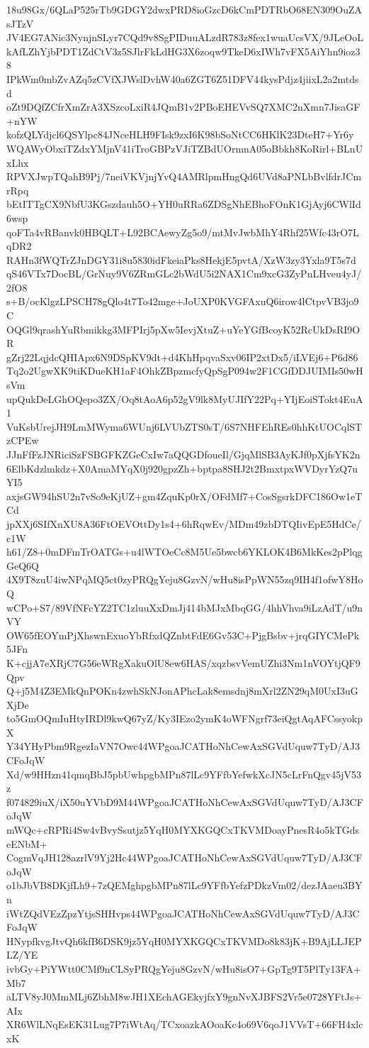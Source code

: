 18u98Gx/6QLaP525rTb9GDGY2dwxPRD8ioGzcD6kCmPDTRbO68EN309OuZAsJTzV
JV4EG7ANic3NynjnSLyr7CQd9v8SgPIDuuALzdR783z8fex1wuaUcsVX/9JLeOoL
kAfLZhYjbPDT1ZdCtV3z5SJlrFkLdHG3X6zoqw9TkeD6xIWh7vFX5AiYhn9ioz38
IPkWm0mbZvAZq5zCVfXJWslDvhW40a6ZGT6Z51DFV44kysPdjz4jiixL2a2mtdsd
oZt9DQfZCfrXmZrA3XSzcoLxiR4JQmB1v2PBoEHEVvSQ7XMC2nXmn7JisaGF+nYW
kofzQLYdjcl6QSYlpc84JNceHLH9FIsk9zxI6K98bSoNtCC6HKlK23DteH7+Yr6y
WQAWyObxiTZdxYMjnV41iTroGBPzVJiTZBdUOrmnA05oBbkh8KoRirl+BLnUxLhx
RPVXJwpTQahB9Pj/7neiVKVjnjYvQ4AMRlpmHngQd6UVd8aPNLbBvlfdrJCmrRpq
bEtITTgCX9NbfU3KGszdauh5O+YH0uRRa6ZDSgNhEBhoFOnK1GjAyj6CWlId6wsp
qoFTa4vRBanvk0HBQLT+L92BCAewyZg5o9/mtMvJwbMhY4Rhf25Wfc43rO7LqDR2
RAHn3fWQTrZJnDGY31i8u5830idFkeiaPks8HekjE5pvtA/XzW3zy3Yxla9T5s7d
qS46VTx7DocBL/GrNuy9V6ZRmGLc2bWdU5i2NAX1Cm9xcG3ZyPnLHveu4yJ/2fO8
s+B/ocKlgzLPSCH78gQlo4t7To42mge+JoUXP0KVGFAxuQ6irow4lCtpvVB3jo9C
OQGl9qrashYuRbmikkg3MFPIrj5pXw5IevjXtuZ+uYeYGfBcoyK52RcUkDsRI9OR
gZrj22LqjdcQHIApx6N9DSpKV9dt+d4KhHpqvaSxv06IP2xtDx5/iLVEj6+P6d86
Tq2o2UgwXK9tiKDueKH1aF4OhkZBpzmcfyQpSgP094w2F1CGfDDJUIMIs50wHsVm
upQukDeLGhOQepo3ZX/Oq8tAoA6p52gV9lk8MyUJIfY22Pq+YIjEoiSTokt4EuA1
VuKsbUrejJH9LmMWyma6WUnj6LVUbZTS0sT/6S7NHFEhREs0hhKtUOCqlSTzCPEw
JJnFfFzJNRiciSzFSBGFKZGeCxIw7aQQGDfoueIl/GjqMlSB3AyKJf0pXjfsYK2n
6ElbKdzlmkdz+X0AmaMYqX0j920gpzZh+bptpa8SHJ2t2BmxtpxWVDyrYzQ7uYI5
axjsGW94hSU2n7vSo9eKjUZ+gm4ZquKp0rX/OFdMf7+CosSgsrkDFC186Ow1eTCd
jpXXj6SIfXnXU8A36FtOEVOttDy1s4+6hRqwEv/MDm49zbDTQIivEpE5HdCe/c1W
h61/Z8+0mDFmTrOATGs+u4lWTOeCc8M5Ue5bwcb6YKLOK4B6MkKes2pPlqgGeQ6Q
4X9T8zuU4iwNPqMQ5ct0zyPRQgYeju8GzvN/wHu8isPpWN55zq9IH4f1ofwY8HoQ
wCPo+S7/89VfNFcYZ2TC1zluuXxDmJj414bMJxMbqGG/4hhVhva9iLzAdT/u9nVY
OW65fEOYmPjXhswnExuoYbRfxdQZnbtFdE6Gv53C+PjgBsbv+jrqGIYCMePk5JFn
K+cjjA7eXRjC7G56eWRgXakuOlU8ew6HAS/xqzbsvVemUZhi3Nm1nVOYtjQF9Qpv
Q+j5M4Z3EMkQnPOKn4zwhSkNJonAPhcLak8emsdnj8mXrl2ZN29qM0UxI3uGXjDe
to5GmOQmIuHtyIRDl9kwQ67yZ/Ky3IEzo2ymK4oWFNgrf73eiQgtAqAFCssyokpX
Y34YHyPbm9RgezIaVN7Owc44WPgoaJCATHoNhCewAxSGVdUquw7TyD/AJ3CFoJqW
Xd/w9HHzn41qmqBbJ5pbUwhpgbMPn87lLc9YFfbYefwkXcJN5cLrFnQgv45jV53z
f074829iuX/iX50uYVbD9M44WPgoaJCATHoNhCewAxSGVdUquw7TyD/AJ3CFoJqW
mWQc+cRPRi4Sw4vBvySsutjz5YqH0MYXKGQCxTKVMDoayPnesR4o5kTGdseENbM+
CogmVqJH128azrlV9Yj2Hc44WPgoaJCATHoNhCewAxSGVdUquw7TyD/AJ3CFoJqW
o1bJbVB8DKjfLh9+7zQEMghpgbMPn87lLc9YFfbYefzPDkzVm02/dezJAaeu3BYn
iWtZQdVEzZpzYtjsSHHvps44WPgoaJCATHoNhCewAxSGVdUquw7TyD/AJ3CFoJqW
HNypfkvgJtvQh6kfB6DSK9jz5YqH0MYXKGQCxTKVMDo8k83jK+B9AjLLJEPLZ/YE
ivbGy+PiYWtt0CMf9nCLSyPRQgYeju8GzvN/wHu8isO7+GpTg9T5PlTy13FA+Mb7
aLTV8yJ0MmMLj6ZbhM8wJH1XEchAGEkyjfxY9gnNvXJBFS2Vr5e0728YFtJs+AIx
XR6WlLNqEsEK31Lug7P7iWtAq/TCxoazkAOoaKc4o69V6qoJ1VVsT+66FH4xlcxK
